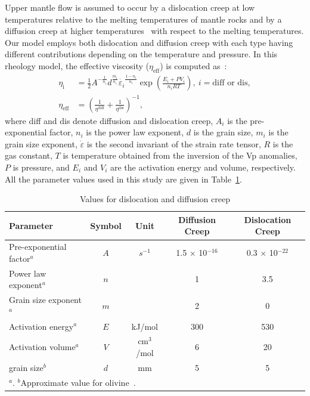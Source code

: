 \documentclass[draft,linenumbers]{agujournal2018}
\begin{document}
Upper mantle flow is assumed to occur by a dislocation creep at low temperatures relative to the melting temperatures of mantle rocks and by a diffusion creep at higher temperatures~\citep[e.g.,][]{gordon1967thermally} with respect to the melting temperatures. Our model employs both dislocation and diffusion creep with each type having different contributions depending on the temperature and pressure. In this rheology model, the effective viscosity ($\eta_{\text{eff}}$) is computed as~\citep{billen2007rheologic}:
%
\begin{align}
    \eta_{\text{i}} &= \frac{1}{2} A^{-\frac{1}{n_i}} d^\frac{m_i}{n_i} \dot{\varepsilon_i}^{\frac{1-n_i}{n_i}} \exp\left(\frac{E_i + PV_i}{n_iRT}\right),\ i=\text{diff or dis}, \\
    \eta_{\text{eff}} &= \left(\frac{1}{\eta^\text{diff}} + \frac{1}{\eta^\text{dis}}\right)^{-1},
\end{align}
%
where diff and dis denote diffusion and dislocation creep, $A_i$ is the pre-exponential factor, $n_i$ is the power law exponent, $d$ is the grain size, $m_i$ is the grain size exponent, $\dot{\varepsilon}$ is the second invariant of the strain rate tensor, $R$ is the gas constant, $T$ is temperature obtained from the inversion of the Vp anomalies, $P$ is pressure, and $E_i$ and $V_i$ are the activation energy and volume, respectively. All the parameter values used in this study are given in Table~\ref{table_model}.
%
\begin{table}[ht] 
    \caption{Values for dislocation and diffusion creep}
    \centering
    \begin{tabular}{l c c c c}
    \hline
     Parameter  & Symbol & Unit & Diffusion Creep & Dislocation Creep  \\
    \hline
      Pre-exponential factor$^a$ & $A$ & $s^{-1}$ & 1.5 $\times$ 10$^{-16}$ & 0.3 $\times$ 10$^{-22}$   \\
      Power law exponent$^a$ & $n$ & & 1 & 3.5  \\
      Grain size exponent$^a$  & $m$ & & 2 & 0   \\
      Activation energy$^a$  & $E$ & kJ/mol & 300 & 530   \\
      Activation volume$^a$  & $V$ & cm$^3$/mol & 6 & 20 \\
      grain size$^b$         & $d$ & mm & 5 & 5 \\
    \hline
    \multicolumn{5}{l}{$^{a}$\citet{karato1993rheology}. $^b$Approximate value for olivine~\citep{karato1984grain}.}
    \end{tabular}
    \label{table_model}
\end{table}
\end{document}
